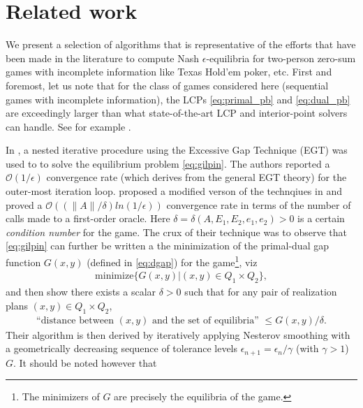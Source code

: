 \documentclass{article} %
\begin{document}
\section{Related work}
\label{sec:related_work}
We present a selection of algorithms that is representative of the
efforts that have been made in the literature to compute Nash
$\epsilon$-equilibria for two-person zero-sum games with incomplete
information like Texas Hold'em poker, etc.
First and foremost, let us note that for the class of games considered
here (sequential games with incomplete information), the LCPs
\eqref{eq:primal_pb} and \eqref{eq:dual_pb} are exceedingly larger
than what state-of-the-art LCP and interior-point solvers can
handle. See for example \cite{hoda2010smoothing,gilpinfirst}.

In \cite{hoda2010smoothing}, a nested iterative procedure using the
Excessive Gap Technique (EGT) \cite{nesterov2005excessive} was used to
to solve the equilibrium problem \eqref{eq:gilpin}.
The authors reported a $\mathcal{O}(1/\epsilon)$ convergence rate
(which derives from the general EGT theory) for the outer-most
iteration loop.
\cite{gilpinfirst} proposed a modified verson of the technqiues in
\cite{hoda2010smoothing} and  proved a $\mathcal{O}\left(\left(\|A\| /
\delta\right) ln\left(1 / \epsilon\right)\right)$ convergence rate in
terms of the number of calls made to a first-order oracle. Here
$\delta = \delta(A, E_1, E_2, e_1, e_2) > 0$ is a certain
\textit{condition number} for the game. The crux of their technique was to
observe that \eqref{eq:gilpin} can further be written a the minimization of
the primal-dual gap function $G(x, y)$ (defined in \eqref{eq:dgap})
for the game\footnote{The minimizers of $G$ are precisely the
  equilibria of the game.}, viz
\begin{eqnarray}
\mathrm{minimize}\{G(x,y)|(x,y) \in Q_1 \times Q_2\},
\end{eqnarray}
and then show there exists a scalar
$\delta > 0$ such that for any pair of realization plans $(x, y) \in Q_1 \times Q_2$,
\begin{eqnarray}
\text{``distance between }(x, y)\text{ and the set of
equilibria'' } \le G(x, y)/\delta.
\end{eqnarray}
Their
algorithm is then derived by iteratively applying Nesterov smoothing \cite{nesterov2005a}
with a geometrically decreasing sequence of tolerance levels
$\epsilon_{n+1} = \epsilon_n / \gamma$ (with $\gamma > 1$)  $G$. It
should be noted however that
\end{document}
